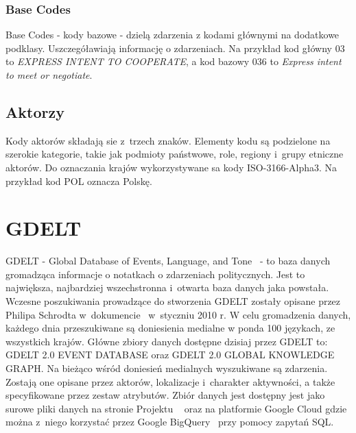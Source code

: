 \documentclass[11pt]{report}
\begin{document}
    \subsubsection{Base Codes}
    Base Codes - kody bazowe - dzielą zdarzenia z kodami głównymi na dodatkowe podklasy.
    Uszczegóławiają informację o zdarzeniach.
    Na przykład kod główny 03 to \textit{EXPRESS INTENT TO COOPERATE},
    a kod bazowy 036 to \textit{Express intent to meet or negotiate}.

    \subsection{Aktorzy}
    Kody aktorów składają sie z~trzech znaków.
    Elementy kodu są podzielone na szerokie kategorie, takie jak podmioty państwowe, role, regiony i~grupy etniczne aktorów.
    Do oznaczania krajów wykorzystywane sa kody ISO-3166-Alpha3.
    Na przykład kod POL oznacza Polskę.


    \section{GDELT}\label{sec:gdelt}
    GDELT - Global Database of Events, Language, and Tone~\cite{gdelt} - to baza danych gromadząca informacje o notatkach o zdarzeniach politycznych.
    Jest to największa, najbardziej wszechstronna i~otwarta baza danych jaka powstała.
    Wczesne poszukiwania prowadzące do stworzenia GDELT zostały opisane przez Philipa Schrodta w~dokumencie~\cite{Schrodt2010} w~styczniu 2010 r.
    W celu gromadzenia danych, każdego dnia przeszukiwane są doniesienia medialne w ponda 100 językach, ze wszystkich krajów.
    Główne zbiory danych dostępne dzisiaj przez GDELT to:
    GDELT 2.0 EVENT DATABASE oraz
    GDELT 2.0 GLOBAL KNOWLEDGE GRAPH\@.
    Na bieżąco wśród doniesień medialnych wyszukiwane są zdarzenia.
    Zostają one opisane przez aktorów, lokalizacje i~charakter aktywności, a także specyfikowane przez zestaw atrybutów.
    Zbiór danych jest dostępny jest jako surowe pliki danych na stronie Projektu ~\cite{gdelt}
    oraz na platformie Google Cloud gdzie można z~niego korzystać przez Google BigQuery~\cite{BigQuery2014} przy pomocy zapytań SQL\@.
\end{document}
